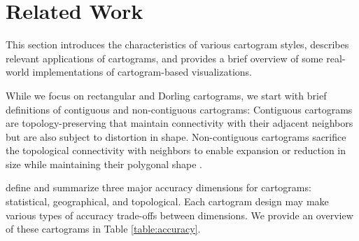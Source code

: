 \section{Related Work}

This section introduces the characteristics of various cartogram styles, describes relevant applications of cartograms, and provides a brief overview of some real-world implementations of cartogram-based visualizations.

While we focus on rectangular and Dorling cartograms, we start with brief definitions of contiguous and non-contiguous cartograms: Contiguous cartograms are topology-preserving that maintain connectivity with their adjacent neighbors but are also subject to distortion in shape. Non-contiguous cartograms sacrifice the topological connectivity with neighbors to enable expansion or reduction in size while maintaining their polygonal shape \cite{dent2009Cartography}.

 define and summarize three major accuracy dimensions for cartograms: statistical, geographical, and topological. Each cartogram design may make various types of accuracy trade-offs between dimensions. We provide an overview of these cartograms in Table \ref{table:accuracy}.


{
\renewcommand{\arraystretch}{1.5}
\begin{table}[!tb]
	\centering
	\caption{ Trade-off between dimensions.  Dimension sacrificed in order to improve  target dimension's accuracy.}
	\label{table:accuracy}
\end{table}
}


